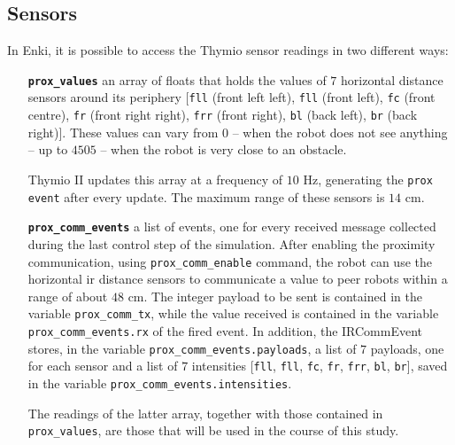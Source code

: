 \subsection{Sensors}
\label{subsec:enkisensors}
In Enki, it is possible to access the Thymio sensor readings in two different ways:

\begin{enumerate}[resume, wide=\parindent, leftmargin=\parindent, 
rightmargin=\parindent]
	
	\item[\textbf{\texttt{prox\_values}}] an array of floats that holds the values of 
	$7$ horizontal distance sensors around its periphery [\texttt{fll} (front left left), 
	\texttt{fll} (front left), \texttt{fc} (front centre), \texttt{fr} (front right right), 
	\texttt{frr} (front right), \texttt{bl} (back left), \texttt{br} (back right)]. 
	These values can vary from $0$ – when the robot does not see anything – up to 
	$4505$ – when the robot is very close to an obstacle. 
	
	Thymio II updates this array at a frequency of $10$ \gls{Hz}, generating the 
	\texttt{prox event} after every update. 
	The maximum range of these sensors is $14$ \gls{cm}.

	\item[\textbf{\texttt{prox\_comm\_events}}] a list of events, one for every 
	received message collected during the last control step of the simulation. 
	After enabling the proximity communication, using 
	\texttt{prox\_comm\_enable} command, the robot can use the horizontal 
	\gls{ir} distance sensors to communicate a value to peer robots within a range 
	of about $48$ \gls{cm}. 
	The integer payload to be sent is contained in the variable 
	\texttt{prox\_comm\_tx}, while the value received is contained in the variable 
	\texttt{prox\_comm\_events.rx} of the fired event.
	In addition, the IRCommEvent stores, in the variable 
	\texttt{prox\_comm\_events.payloads}, a list of $7$ payloads, one for each 
	sensor and a list of  $7$ intensities  [\texttt{fll}, \texttt{fll}, \texttt{fc}, \texttt{fr}, 
	\texttt{frr}, \texttt{bl}, \texttt{br}], saved in the variable 
	\texttt{prox\_comm\_events.intensities}.
	
	The readings of the latter array, together with those contained in 
	\texttt{prox\_values}, are those that will be used in the course of this study.
\end{enumerate}

